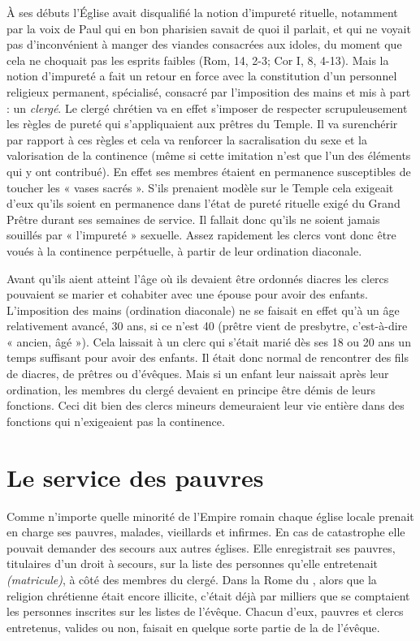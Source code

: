  À ses débuts l'Église avait disqualifié la notion d'impureté rituelle, notamment par la voix de Paul qui en bon pharisien savait de quoi il parlait, et qui ne voyait pas d'inconvénient à manger des viandes consacrées aux idoles, du moment que cela ne choquait pas les esprits faibles (Rom, 14, 2-3; Cor I, 8, 4-13). Mais la notion d'impureté a fait un retour en force avec la constitution d'un personnel religieux permanent, spécialisé, consacré par l'imposition des mains et mis à part : un \emph{clergé}. Le clergé chrétien va en effet s'imposer de respecter scrupuleusement les règles de pureté qui s'appliquaient aux prêtres du Temple. Il va surenchérir par rapport à ces règles et cela va renforcer la sacralisation du sexe et la valorisation de la continence (même si cette imitation n'est que l'un des éléments qui y ont contribué). En effet ses membres étaient en permanence susceptibles de toucher les « vases sacrés ». S'ils prenaient modèle sur le Temple cela exigeait d'eux qu'ils soient en permanence dans l'état de pureté rituelle exigé du Grand Prêtre durant ses semaines de service. Il fallait donc qu'ils ne soient jamais souillés par « l'impureté » sexuelle. Assez rapidement les clercs vont donc être voués à la continence perpétuelle, à partir de leur ordination diaconale. 

 Avant qu'ils aient atteint l'âge où ils devaient être ordonnés diacres les clercs pouvaient se marier et cohabiter avec une épouse pour avoir des enfants. L'imposition des mains (ordination diaconale) ne se faisait en effet qu'à un âge relativement avancé, 30 ans, si ce n'est 40 (prêtre vient de presbytre, c'est-à-dire « ancien, âgé »). Cela laissait  à un clerc qui s'était marié dès ses 18 ou 20 ans un temps suffisant pour avoir des enfants. Il était donc normal de rencontrer des fils de diacres, de prêtres ou d'évêques. Mais si un enfant leur naissait après leur ordination, les membres du clergé devaient en principe être démis de leurs fonctions. Ceci dit bien des clercs mineurs demeuraient leur vie entière dans des fonctions qui n'exigeaient pas la continence. 
 
 
 \section{Le service des pauvres}

 
 
 Comme n'importe quelle minorité de l'Empire romain chaque église locale prenait en charge ses pauvres, malades, vieillards et infirmes. En cas de catastrophe elle pouvait demander des secours aux autres églises. Elle enregistrait ses pauvres, titulaires d'un droit à secours, sur la liste des personnes qu'elle entretenait \emph{(matricule)}, à côté des membres du clergé. Dans la Rome du , alors que la religion chrétienne était encore illicite, c'était déjà par milliers que se comptaient les personnes inscrites sur les listes de l'évêque. Chacun d'eux, pauvres et clercs entretenus, valides ou non, faisait en quelque sorte partie de la  de l'évêque. 

